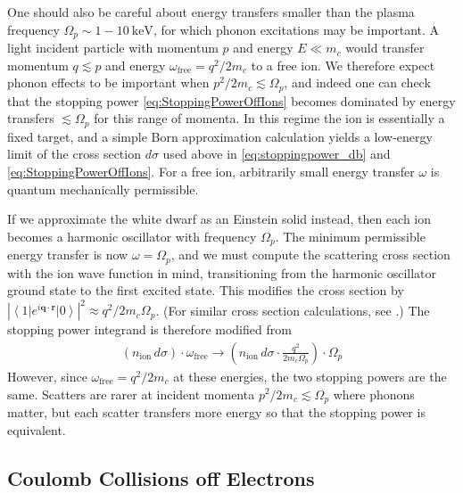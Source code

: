 \documentclass[twocolumn,preprintnumbers,amsmath,amssymb,prl, superscriptaddress]{revtex4}
\newcommand{\ket}[1]{\ensuremath{\left|#1\right>}}
\newcommand{\bra}[1]{\ensuremath{\left<#1\right|}}
\begin{document}
\begin{appendices}
One should also be careful about energy transfers smaller than the plasma frequency $\Omega_p \sim 1-10~\text{keV}$, for which phonon excitations may be important. A light incident particle with momentum $p$ and energy $E\ll m_c$ would transfer momentum $q\lesssim p$ and energy $\omega_\text{free} = q^2/2 m_c$ to a free ion. We therefore expect phonon effects to be important when $p^2/2 m_c \lesssim \Omega_p$, and indeed one can check that the stopping power \eqref{eq:StoppingPowerOffIons} becomes dominated by energy transfers $\lesssim \Omega_p$ for this range of momenta. In this regime the ion is essentially a fixed target, and a simple Born approximation calculation yields a low-energy limit of the cross section $d \sigma$ used above in \eqref{eq:stoppingpower_db} and \eqref{eq:StoppingPowerOffIons}. For a free ion, arbitrarily small energy transfer $\omega$ is quantum mechanically permissible.

If we approximate the white dwarf as an Einstein solid instead, then each ion becomes a harmonic oscillator with frequency $\Omega_p$. The minimum permissible energy transfer is now $\omega = \Omega_p$, and we must compute the scattering cross section with the ion wave function in mind, transitioning from the harmonic oscillator ground state to the first excited state. This modifies the cross section by $|\bra{1}e^{i\textbf{q}\cdot \textbf{r}}\ket{0}|^2\approx q^2/2 m_c\Omega_p$. (For similar cross section calculations, see \cite{Hofstadter}.) The stopping power integrand is therefore modified from
\begin{align}
(n_\text{ion}\, d\sigma)\cdot\omega_\text{free} \to (n_\text{ion}\, d\sigma\cdot\frac{q^2}{2 m_c\Omega_p})\cdot \Omega_p
\end{align}
However, since $\omega_\text{free} = q^2/2 m_c$ at these energies, the two stopping powers are the same. Scatters are rarer at incident momenta $p^2/2 m_c \lesssim \Omega_p$ where phonons matter, but each scatter transfers more energy so that the stopping power is equivalent.


\subsection{Coulomb Collisions off Electrons}


\end{appendices}
\end{document}
